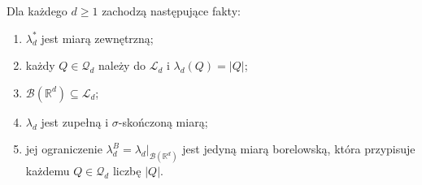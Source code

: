 \begin{twierdzenie}
\label{thm:lebesgue-exists}
Dla każdego $d\ge1$ zachodzą następujące fakty:
\begin{enumerate}[label=\textup{(\roman*)}]
\item $\lambda_d^*$ jest miarą zewnętrzną;
\item każdy $Q\in\mathcal Q_d$ należy do $\mathcal L_d$ i
$\lambda_d(Q)=|Q|$;
\item $\mathcal B(\mathbb R^d)\subseteq\mathcal L_d$;
\item $\lambda_d$ jest zupełną i $\sigma$-skończoną miarą;
\item jej ograniczenie
$\lambda_d^B=\lambda_d|_{\mathcal B(\mathbb R^d)}$
jest jedyną miarą borelowską, która przypisuje każdemu
$Q\in\mathcal Q_d$ liczbę $|Q|$.
\end{enumerate}
\end{twierdzenie}

